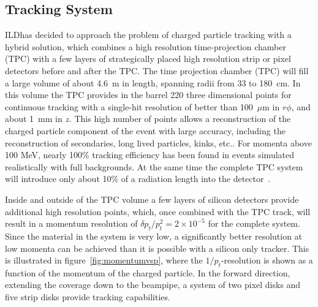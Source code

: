 \documentclass[%
 amsmath,amssymb,
 aps,
]{revtex4-1}
\begin{document}
\subsection{Tracking System}

 ILDhas decided to approach the problem of charged particle tracking with a hybrid solution, which combines a high resolution time-projection chamber (TPC) with a few layers of strategically placed high resolution strip or pixel detectors before and after the TPC. 
The time projection chamber (TPC) will fill a large volume of about 4.6~m in length, spanning radii from 33 to 180~cm. In this volume the TPC provides in the barrel 220 three dimensional points for continuous tracking with a single-hit resolution of better than 100~$\mu\mathrm{m}$ in $r \phi$, and about 1~mm in $z$. This high number of points allows a reconstruction of the charged particle component of the event with large accuracy, including the reconstruction of secondaries, long lived particles, kinks, etc.. For momenta above 100 MeV, nearly 100\% tracking efficiency has been found in events simulated realistically with full backgrounds. At the same time the complete TPC system will introduce only about 10\% of a radiation length into the detector~\cite{Diener:2012mc}. 

Inside and outside of the TPC volume a few layers of silicon detectors provide additional high resolution points, which, once combined with the TPC track, will result in a momentum resolution of $\delta p_t / p_t^2 = 2 \times 10^{-5}$ for the complete system. Since the material in the system is very low, a significantly better resolution at low momenta can be achieved than it is possible with a silicon only tracker. This is illustrated in figure~\ref{fig:momentumvsp}, where the $1/p_t$-resolution is shown as a function of the momentum of the charged particle. In the forward direction, extending the coverage down to the beampipe, a system of two pixel disks and five strip disks provide tracking capabilities. 
\end{document}
